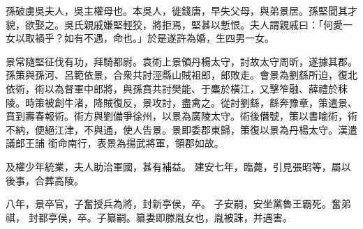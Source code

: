 \begin{pinyinscope}
 
 
 孫破虜吳夫人，吳主權母也。本吳人，徙錢唐，早失父母，與弟景居。孫堅聞其才貌，欲娶之。吳氏親戚嫌堅輕狡，將拒焉，堅甚以慙恨。夫人謂親戚曰：「何愛一女以取禍乎？如有不遇，命也。」於是遂許為婚，生四男一女。
 
 
 
 
景常隨堅征伐有功，拜騎都尉。袁術上景領丹楊太守，討故太守周昕，遂據其郡。孫策與孫河、呂範依景，合衆共討涇縣山賊祖郎，郎敗走。會景為劉繇所迫，復北依術，術以為督軍中郎將，與孫賁共討樊能、于麋於橫江，又擊笮融、薛禮於秣陵。時策被創牛渚，降賊復反，景攻討，盡禽之。從討劉繇，繇奔豫章，策遣景、賁到壽春報術。術方與劉備爭徐州，以景為廣陵太守。術後僭號，策以書喻術，術不納，便絕江津，不與通，使人告景。景即委郡東歸，策復以景為丹楊太守。漢遣議郎王誧
 銜命南行，表景為揚武將軍，領郡如故。
 
 
及權少年統業，夫人助治軍國，甚有補益。
 建安七年，臨薨，引見張昭等，屬以後事，合葬高陵。
 
 
八年，景卒官，子奮授兵為將，封新亭侯，卒。
 子安嗣，安坐黨魯王霸死。奮弟祺，
 封都亭侯，卒。子纂嗣。纂妻即滕胤女也，胤被誅，并遇害。
 
 
\end{pinyinscope}